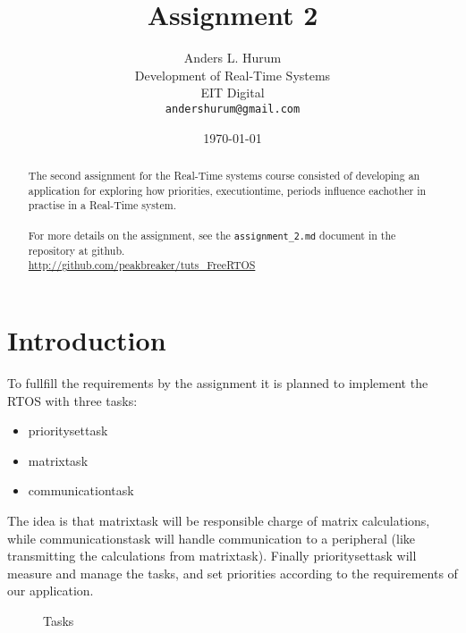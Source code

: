 \documentclass[12pt,fleqn,leqno,letterpaper]{article}
\title{Assignment 2}
\author{Anders L. Hurum\\
    \small{Development of Real-Time Systems}\\
    \small{EIT Digital}\\
    \small{\texttt{andershurum@gmail.com}}
}
\date{\today}
\begin{document}
    \maketitle

    \begin{abstract}

        The second assignment for the Real-Time systems course consisted of developing
        an application for exploring how priorities, executiontime, periods influence eachother
        in practise in a Real-Time system. \\ \\
        For more details on the assignment, see the \texttt{assignment\_2.md} document
        in the repository at github. \\

        \url{http://github.com/peakbreaker/tuts\_FreeRTOS}

    \end{abstract}

    \newpage

    \section*{Introduction}
        To fullfill the requirements by the assignment it is planned to implement the RTOS
        with three tasks:

        \begin{itemize}
            \item prioritysettask
            \item matrixtask
            \item communicationtask
        \end{itemize}

        The idea is that matrixtask will be responsible charge of matrix calculations, while
        communicationstask will handle communication to a peripheral (like transmitting the calculations from matrixtask).
        Finally prioritysettask will measure and manage the tasks, and set priorities according to the requirements
        of our application. \\

        \begin{figure}[h]
            \centering
            \caption{Tasks}
            \label{figure:tasks}
        \end{figure}
\end{document}
